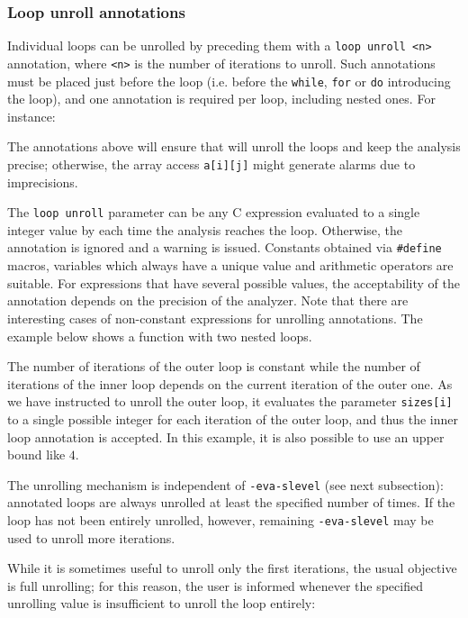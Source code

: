 \documentclass{frama-c-book}
\begin{document}
\subsubsection{Loop unroll annotations}

Individual loops can be unrolled by preceding them with a
\lstinline|loop unroll <n>| annotation, where \lstinline|<n>| is the number
of iterations to unroll.
Such annotations must be placed just before the loop (i.e. before the
\lstinline|while|, \lstinline|for| or \lstinline|do| introducing the loop),
and one annotation is required per loop, including nested ones. For instance:


The annotations above will ensure
that \Eva{} will unroll the loops and keep the analysis precise; otherwise,
the array access \lstinline|a[i][j]| might generate alarms due to imprecisions.

The \lstinline|loop unroll| parameter can be any C expression evaluated to a
single integer value by \Eva{} each time the analysis reaches the loop.
Otherwise, the annotation is ignored and a warning is issued.
Constants obtained via \lstinline|#define| macros, variables which always have
a unique value and arithmetic operators are suitable.
For expressions that have several possible values,
the acceptability of the annotation depends on the precision of the analyzer.
Note that there are interesting cases of non-constant expressions for
unrolling annotations. The example below shows a function with two nested loops.


The number of iterations of the outer loop is constant while the number of
iterations of the inner loop depends on the current iteration of the outer
one. As we have instructed \Eva{} to unroll the outer loop, it evaluates the
parameter \lstinline|sizes[i]| to a single possible integer for each iteration
of the outer loop, and thus the inner loop annotation is accepted. In this
example, it is also possible to use an upper bound like $4$.

The unrolling mechanism is independent of \lstinline|-eva-slevel|
(see next subsection): annotated loops are always unrolled at least the specified
number of times. If the loop has not been entirely unrolled, however,
remaining \lstinline|-eva-slevel| may be used to unroll more iterations.

While it is sometimes useful to unroll only the first iterations, the usual
objective is full unrolling; for this reason, the user is informed whenever
the specified unrolling value is insufficient to unroll the loop entirely:
\end{document}
